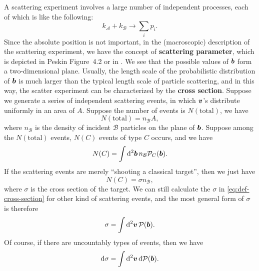 \documentclass[hyperref, a4paper]{article}
\newcommand*{\concept}[1]{{\textbf{#1}}}
\begin{document}
A scattering experiment involves a large number of independent processes, each of which is like the following: 
\begin{equation}
    k_\mathcal{A} + k_\mathcal{B} \longrightarrow \sum_{i} p_i.
\end{equation}
Since the absolute position is not important, in the (macroscopic) description of the scattering experiment, 
we have the concept of \concept{scattering parameter}, which is depicted in Peskin Figure~4.2 or 
in . We see that the possible values of $\vb*{b}$ form a two-dimensional plane.
Usually, the length scale of the probabilistic distribution of $\vb*{b}$ is much larger than the typical length
scale of particle scattering, and in this way, the scatter experiment can be characterized by the 
\concept{cross section}. Suppose we generate a series of independent scattering events, 
in which $\vb*{v}$'s distribute uniformly in an area of $A$. 
Suppose the number of events is $N(\text{total})$, we have 
\[
    N(\text{total}) = n_\mathcal{B} A, 
\]
where $n_\mathcal{B}$ is the density of incident $\mathcal{B}$ particles on the plane of $\vb*{b}$.
Suppose among the $N(\text{total})$ events, $N(C)$ events of type $C$ occurs, and we have 
\[
    N(C) = \int \dd[2]{\vb*{b}} n_\mathcal{B} \mathcal{P}_C(\vb*{b}).
\]
If the scattering events are merely ``shooting a classical target'', then we just have 
\begin{equation}
    N(C) = \sigma n_\mathcal{B},
    \label{eq:def-cross-section}
\end{equation}
where $\sigma$ is the cross section of the target. We can still calculate the $\sigma$ in 
\eqref{eq:def-cross-section} for other kind of scattering events, and the most general form of $\sigma$ is therefore 
\begin{equation}
    \sigma = \int \dd[2]{\vb*{v}} \mathcal{P}(\vb*{b}).
    \label{eq:cross-section}
\end{equation}
Of course, if there are uncountably types of events, then we have 
\begin{equation}
    \dd{\sigma} = \int \dd[2]{\vb*{v}} \dd\mathcal{P}(\vb*{b}).
    \label{eq:diff-cross-section}
\end{equation}
\end{document}
